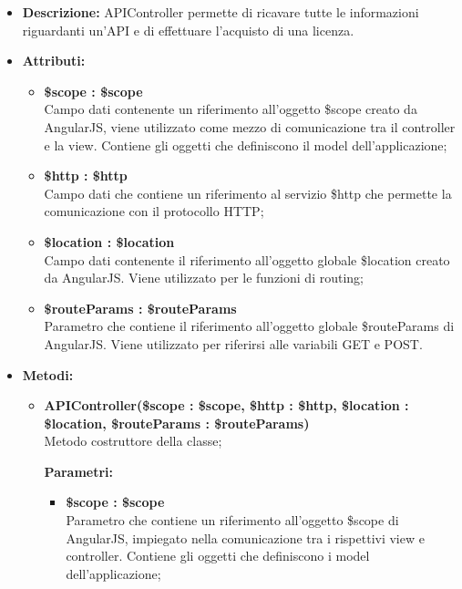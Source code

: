 \begin{itemize}
	\item \textbf{Descrizione:} APIController permette di ricavare tutte le informazioni riguardanti un'API e di effettuare l'acquisto di una licenza.
	\item \textbf{Attributi:}
	\begin{itemize}
		
		\item \textbf{\$scope : \$scope}\\
		Campo dati contenente un riferimento all'oggetto \$scope creato da AngularJS, viene utilizzato come mezzo di comunicazione tra il controller e la view. Contiene gli oggetti che definiscono il model dell'applicazione;
		
		\item \textbf{\$http : \$http }\\
		Campo dati che contiene un riferimento al servizio \$http che permette la comunicazione con il protocollo HTTP;
		
		\item \textbf{\$location : \$location }\\
		Campo dati contenente il riferimento all'oggetto globale \$location creato da AngularJS. Viene utilizzato per le funzioni di routing;
		
		\item \textbf{\$routeParams : \$routeParams}\\
		Parametro che contiene il riferimento all'oggetto globale \$routeParams di AngularJS. Viene utilizzato per riferirsi alle variabili GET e POST.
		
		
	\end{itemize}
	\item \textbf{Metodi:}
	\begin{itemize}
		
		\item \textbf{APIController(\$scope : \$scope, \$http : \$http, \$location : \$location, \$routeParams : \$routeParams)}\\
		Metodo costruttore della classe;
		\begin{description}
			\item[\textbf{Parametri:}]
		\end{description}
		\begin{itemize}
			\item \textbf{\$scope : \$scope}\\
			Parametro che contiene un riferimento all'oggetto \$scope di AngularJS, impiegato nella comunicazione tra i rispettivi view e controller. Contiene gli oggetti che definiscono i model dell'applicazione;
			

\end{itemize}
\end{itemize}
\end{itemize}
